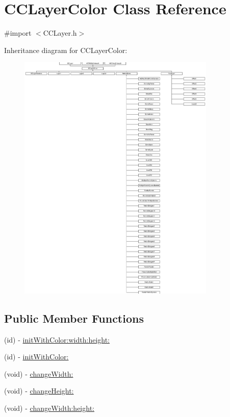 \hypertarget{interface_c_c_layer_color}{\section{C\-C\-Layer\-Color Class Reference}
\label{interface_c_c_layer_color}
}


{\ttfamily \#import $<$C\-C\-Layer.\-h$>$}

Inheritance diagram for C\-C\-Layer\-Color\-:\begin{figure}[H]
\begin{center}
\leavevmode
\includegraphics[height=12.000000cm]{interface_c_c_layer_color}
\end{center}
\end{figure}
\subsection*{Public Member Functions}
\begin{DoxyCompactItemize}
\item 
(id) -\/ \hyperlink{interface_c_c_layer_color_a3f04e69e1055ebbdbe42aecc70baa462}{init\-With\-Color\-:width\-:height\-:}
\item 
(id) -\/ \hyperlink{interface_c_c_layer_color_a9e880feb376a13156f3438adeb0b3f08}{init\-With\-Color\-:}
\item 
(void) -\/ \hyperlink{interface_c_c_layer_color_af3bd20a1c07ba24e2de52e9065ab8e55}{change\-Width\-:}
\item 
(void) -\/ \hyperlink{interface_c_c_layer_color_a5fc90d098e59d3721199c93b1f104be0}{change\-Height\-:}
\item 
(void) -\/ \hyperlink{interface_c_c_layer_color_a962603ad032b623af5408c2f0c0c8e8e}{change\-Width\-:height\-:}
\end{DoxyCompactItemize}
